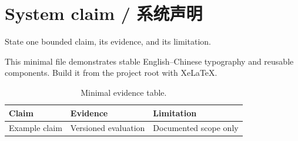 \documentclass{moonweave-report}
\begin{document}
\chapter{System claim / 系统声明}

State one bounded claim, its evidence, and its limitation.

\begin{MWInsight}
This minimal file demonstrates stable English–Chinese typography and reusable
components. Build it from the project root with XeLaTeX.
\end{MWInsight}

\begin{table}[H]
\centering
\caption{Minimal evidence table.}
\begin{tabularx}{\textwidth}{@{}L{0.25\textwidth}YY@{}}
\toprule
{}
\textbf{Claim} & \textbf{Evidence} & \textbf{Limitation} \\
\midrule
Example claim & Versioned evaluation & Documented scope only \\
\bottomrule
\end{tabularx}
\end{table}
\end{document}
